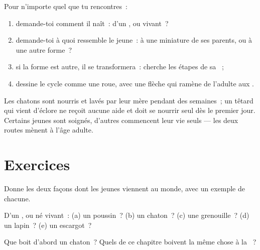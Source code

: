 \begin{method}\label{met:g2:animals-grow-up:read}
Pour n'importe quel  que tu rencontres~:
\begin{enumerate}
  \item demande-toi comment il naît~: d'un , ou vivant~?
  \item demande-toi à quoi ressemble le jeune~: à une miniature de
        ses parents, ou à une autre forme~?
  \item si la forme est autre, il se transformera~: cherche les
        étapes de sa ~;
  \item dessine le cycle comme une roue, avec une flèche qui
        ramène de l'adulte aux .
\end{enumerate}
\end{method}

\begin{remark}\label{rem:g2:animals-grow-up:care}
Les chatons sont nourris et lavés par leur mère pendant des
semaines~; un têtard qui vient d'éclore ne reçoit aucune aide et
doit se nourrir seul dès le premier jour. Certains jeunes 
sont soignés, d'autres commencent leur vie seuls --- les deux routes
mènent à l'âge adulte.
\end{remark}

\section{Exercices}

\begin{exercise}[$\star$]\label{exo:g2:animals-grow-up:1}
Donne les deux façons dont les jeunes  viennent au monde,
avec un exemple de chacune.
\end{exercise}

\begin{exercise}[$\star$]\label{exo:g2:animals-grow-up:2}
D'un , ou né vivant~: (a) un poussin~? (b) un chaton~? (c) une
grenouille~? (d) un lapin~? (e) un escargot~?
\end{exercise}

\begin{exercise}[$\star$]\label{exo:g2:animals-grow-up:3}
Que boit d'abord un chaton~? Quels  de ce chapitre boivent la
même chose à la ~?
\end{exercise}

